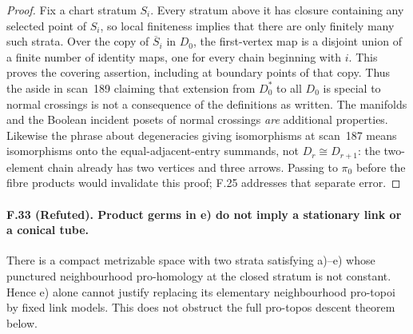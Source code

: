 \begin{proof}
Fix a chart stratum $S_i$. Every stratum above it has closure containing
any selected point of $S_i$, so local finiteness implies that there are
only finitely many such strata. Over the copy of $\overline S_i$ in
$D_0$, the first-vertex map is a disjoint union of a finite number of
identity maps, one for every chain beginning with $i$. This proves the
covering assertion, including at boundary points of that copy. Thus the
aside in scan~189 claiming that extension from $D_0^*$ to all $D_0$ is
special to normal crossings is not a consequence of the definitions
as written. The manifolds and the Boolean incident posets of normal
crossings \emph{are} additional properties. Likewise the phrase about
degeneracies giving isomorphisms at scan~187 means isomorphisms onto the
equal-adjacent-entry summands, not $D_r\cong D_{r+1}$: the two-element
chain already has two vertices and three arrows. Passing to $\pi_0$
before the fibre products would invalidate this proof; F.25 addresses
that separate error.
\end{proof}

\paragraph{F.33 (Refuted). Product germs in e) do not imply a stationary
link or a conical tube.}
There is a compact metrizable space with two strata satisfying a)--e)
whose punctured neighbourhood pro-homology at the closed stratum is not
constant. Hence e) alone cannot justify replacing its elementary
neighbourhood pro-topoi by fixed link models. This does not obstruct
the full pro-topos descent theorem below.

